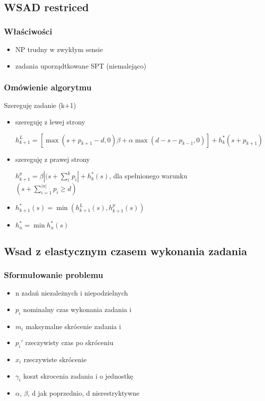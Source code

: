 \documentclass[12pt,a4paper]{article}
\begin{document}
\subsection{WSAD restriced}
\subsubsection{Właściwości}
\begin{itemize}
\item NP trudny w zwykłym sensie
\item zadania uporządtkowane SPT (niemalejąco)
\end{itemize}
\subsubsection{Omówienie algorytmu}
Szereguję zadanie (k+1)
\begin{itemize}
\item szereguję z lewej strony

$h_{k+1}^{L}=[\max(s+p_{k+1}-d,0)\beta + \alpha\max(d-s-p_{k-1},0)]+h_{k}^{*}(s+p_{k+1})$
\item szereguję z prawej strony

$h_{k+1}^{p}=\beta\left | (s+\sum\limits_{i}^{k}p_{i} \right | +h_{k}^{*}(s)$, dla spełnionego warunku $(s+\sum\limits_{i=1}^{|n|}p_{i}\geq d)$
\item $h_{k+1}^{*}(s)=\min(h_{k+1}^{L}(s), h_{k+1}^{p}(s))$
\item $h_{n}^{*}=\min h_{n}^{*}(s)$
\end{itemize}
\subsection{Wsad z elastycznym czasem wykonania zadania}
\subsubsection{Sformułowanie problemu}
\begin{itemize}
\item n zadań niezależnych i niepodzielnych
\item $p_{i}$ nominalny czas wykonania zadania i
\item $m_{i}$ maksymalne skrócenie zadania i
\item $p_{i}'$ rzeczywisty czas po skróceniu
\item $x_{i}$ rzeczywiste skrócenie
\item $\gamma_{i}$ koszt skrocenia zadania i o jednostkę
\item $\alpha$, $\beta$, d jak poprzednio, d nierestryktywne
\end{itemize}
\end{document}
